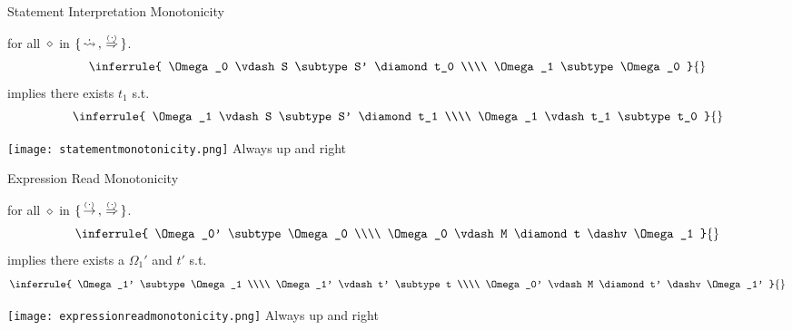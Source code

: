 \documentclass[12pt,twoside]{report}
\begin{document}
\begin{Property}{Statement Interpretation Monotonicity}{}
  \begin{minipage}{0.6\textwidth}
    \centering
    for all $\diamond$ in $\{ \,\dot{\rightsquigarrow}\,, \,\stackrel{_(._)}{\Rightarrow}\, \}$.
    \[\inferrule{
      \Omega_0 \vdash S \subtype S' \diamond t_0 \\\\
      \Omega_1 \subtype \Omega_0
    }{}\]
    implies there exists $t_1$ s.t.
    \[\inferrule{
      \Omega_1 \vdash S \subtype S' \diamond t_1 \\\\
      \Omega_1 \vdash t_1 \subtype t_0
    }{}\]
  \end{minipage}
  \begin{minipage}{0.3\textwidth}
    \centering
    \texttt{[image: statementmonotonicity.png]}
    Always up and right
  \end{minipage}
\end{Property}
\label{property:statementmonotonicity}

\begin{Property}{Expression Read Monotonicity}{}
  \begin{minipage}{0.6\textwidth}
    \centering
    for all $\diamond$ in $\{  \,\stackrel{_(._)}{\rightarrow}\,, \,\stackrel{_(._)}{\Rightarrow}\,  \}$.
    \[\inferrule{
      \Omega_0' \subtype \Omega_0 \\\\
      \Omega_0 \vdash M \diamond t \dashv \Omega_1
    }{}\]
    implies there exists a $\Omega_1'$ and $t'$ s.t.
    \[\inferrule{
      \Omega_1' \subtype \Omega_1 \\\\
      \Omega_1' \vdash t' \subtype t \\\\
      \Omega_0' \vdash M \diamond t' \dashv \Omega_1' 
    }{}\]
  \end{minipage}
  \begin{minipage}{0.3\textwidth}
    \centering
    \texttt{[image: expressionreadmonotonicity.png]}
    Always up and right
  \end{minipage}
  \label{property:expressionreadmonotonicity}
\end{Property}
\end{document}
